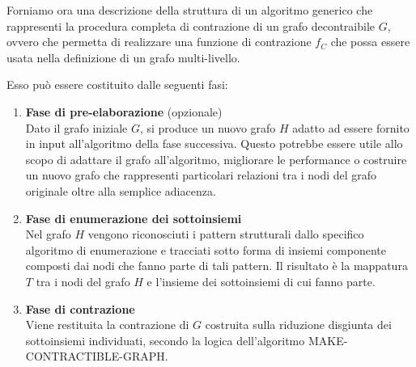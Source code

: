 
Forniamo ora una descrizione della struttura di un algoritmo generico che rappresenti la procedura completa di
contrazione di un grafo decontraibile $G$, ovvero che permetta di realizzare una funzione di contrazione $f_C$
che possa essere usata nella definizione di un grafo multi-livello.

Esso pu\`o essere costituito dalle seguenti fasi:
\begin{enumerate}
    \item \textbf{Fase di pre-elaborazione} (opzionale) \\
    Dato il grafo iniziale $G$, si produce un nuovo grafo $H$ adatto ad essere fornito in input all'algoritmo
    della fase successiva.
    Questo potrebbe essere utile allo scopo di adattare il grafo all'algoritmo, migliorare le performance o
    costruire un nuovo grafo che rappresenti particolari relazioni tra i nodi del grafo originale oltre alla
    semplice adiacenza.
    \item \textbf{Fase di enumerazione dei sottoinsiemi} \\
    Nel grafo $H$ vengono riconosciuti i pattern strutturali dallo specifico algoritmo di enumerazione e tracciati
    sotto forma di insiemi componente composti dai nodi che fanno parte di tali pattern.
    Il risultato \`e la mappatura $T$ tra i nodi del grafo $H$ e l'insieme dei sottoinsiemi di cui fanno parte.
    \item \textbf{Fase di contrazione} \\
    Viene restituita la contrazione di $G$ costruita sulla riduzione disgiunta dei sottoinsiemi individuati,
    secondo la logica dell'algoritmo MAKE-CONTRACTIBLE-GRAPH\@.
\end{enumerate}



